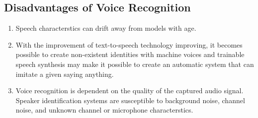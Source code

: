 \subsection{Disadvantages of Voice Recognition}

\begin{enumerate}
  \item Speech characterstics can drift away from models with age.
  \item With the improvement of text-to-speech technology improving, it becomes possible to create non-existent identities with machine voices and trainable speech synthesis may make it possible to create an automatic system that can imitate a given saying anything.
  \item Voice recognition is dependent on the quality of the captured audio signal. Speaker identification systems are susceptible to background noise, channel noise, and unknown channel or microphone characterstics.
\end{enumerate}
